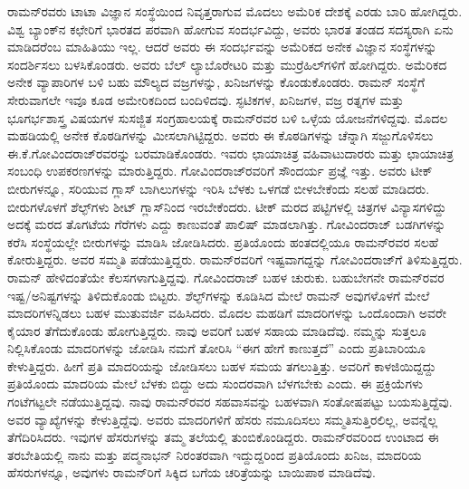 ರಾಮನ್‍ರವರು ಟಾಟಾ ವಿಜ್ಞಾನ ಸಂಸ್ಥೆಯಿಂದ ನಿವೃತ್ತರಾಗುವ ಮೊದಲು ಅಮೆರಿಕ ದೇಶಕ್ಕೆ ಎರಡು ಬಾರಿ ಹೋಗಿದ್ದರು. ವಿಶ್ವ ಬ್ಯಾಂಕ್‍ನ ಕಛೇರಿಗೆ ಭಾರತದ ಪರವಾಗಿ ಹೋಗುವ ಸಂದರ್ಭವಿದ್ದು, ಅವರು ಭಾರತ ತಂಡದ ಸದಸ್ಯರಾಗಿ ಏನು ಮಾಡಿದರೆಂಬ ಮಾಹಿತಿಯು ಇಲ್ಲ. ಆದರೆ ಅವರು ಈ ಸಂದರ್ಭವನ್ನು ಅಮೆರಿಕದ ಅನೇಕ ವಿಜ್ಞಾನ ಸಂಸ್ಥೆಗಳನ್ನು ಸಂದರ್ಶಿಸಲು ಬಳಸಿಕೊಂಡರು. ಅವರು ಬೆಲ್ ಲ್ಯಾಬೊರೇಟರಿ ಮತ್ತು ಮುರ್ರೆಹಿಲ್‍ಗಳಿಗೆ ಹೋಗಿದ್ದರು. ಅಮೆರಿಕದ ಅನೇಕ ವ್ಯಾಪಾರಿಗಳ ಬಳಿ ಬಹು ಮೌಲ್ಯದ ವಜ್ರಗಳನ್ನು, ಖನಿಜಗಳನ್ನು ಕೊಂಡು\-ಕೊಂಡರು. ರಾಮನ್ ಸಂಸ್ಥೆಗೆ ಸೇರುವಾಗಲೇ ಇವೂ ಕೂಡ ಅಮೇರಿಕದಿಂದ ಬಂದಿಳಿದವು. ಸ್ಫಟಿಕಗಳ, ಖನಿಜಗಳ, ವಜ್ರ ರತ್ನಗಳ ಮತ್ತು ಭೂಗರ್ಭಶಾಸ್ತ್ರ ವಿಷಯಗಳ ಸುಸಜ್ಜಿತ ಸಂಗ್ರಹಾಲಯಕ್ಕೆ ರಾಮನ್‍ರವರ ಬಳಿ ಒಳ್ಳೆಯ ಯೋಜನೆಗಳಿದ್ದವು. ಮೊದಲ ಮಹಡಿಯಲ್ಲಿ ಅನೇಕ ಕೊಠಡಿಗಳನ್ನು ಮೀಸಲಾಗಿಟ್ಟಿದ್ದರು. ಅವರು ಈ ಕೊಠಡಿಗಳನ್ನು ಚೆನ್ನಾಗಿ ಸಜ್ಜುಗೊಳಿಸಲು ಈ.ಕೆ.ಗೋವಿಂದರಾಜ್\-‍ರವರನ್ನು ಬರಮಾಡಿಕೊಂಡರು. ಇವರು ಛಾಯಾಚಿತ್ರ ವಹಿವಾಟುದಾರರು ಮತ್ತು ಛಾಯಾಚಿತ್ರ ಸಂಬಂಧಿ ಉಪಕರಣಗಳನ್ನು ಮಾರುತ್ತಿದ್ದರು. ಗೋವಿಂದರಾಜ್‍ರವರಿಗೆ ಸೌಂದರ್ಯ ಪ್ರಜ್ಞೆ ಇತ್ತು. ಅವರು ಟೀಕ್ ಬೀರುಗಳನ್ನೂ, ಸರಿಯುವ ಗ್ಲಾಸ್ ಬಾಗಿಲುಗಳನ್ನು ಇರಿಸಿ ಬೆಳಕು ಒಳಗಡೆ ಬೀಳಬೇಕೆಂದು ಸಲಹೆ ಮಾಡಿದರು. ಬೀರುಗಳೊಳಗೆ ಶೆಲ್ಫ್‌ಗಳು ಶೀಟ್ ಗ್ಲಾಸ್‍ನಿಂದ ಇರಬೇಕೆಂದರು. ಟೀಕ್ ಮರದ ಪಟ್ಟಿಗಳಲ್ಲಿ ಚಿತ್ರಗಳ ವಿನ್ಯಾಸಗಳಿದ್ದು ಅದಕ್ಕೆ ಮರದ ತೊಗಟೆಯ ಗೆರೆಗಳು ಎದ್ದು ಕಾಣುವಂತೆ ಪಾಲಿಷ್ ಮಾಡಲಾಗಿತ್ತು. ಗೋವಿಂದರಾಜ್ ಬಡಗಿಗಳನ್ನು ಕರೆಸಿ ಸಂಸ್ಥೆಯಲ್ಲೇ ಬೀರುಗಳನ್ನು ಮಾಡಿಸಿ ಜೋಡಿಸಿದರು. ಪ್ರತಿಯೊಂದು ಹಂತದಲ್ಲಿಯೂ ರಾಮನ್‍ರವರ ಸಲಹೆ ಕೋರುತ್ತಿದ್ದರು. ಅವರ ಸಮ್ಮತಿ ಪಡೆಯುತ್ತಿದ್ದರು. ರಾಮನ್‍ರವರಿಗೆ ಇಷ್ಟವಾಗದ್ದನ್ನು ಗೋವಿಂದರಾಜ್‍ಗೆ ತಿಳಿಸುತ್ತಿದ್ದರು. ರಾಮನ್ ಹೇಳಿದಂತೆಯೇ ಕೆಲಸಗಳಾಗುತ್ತಿದ್ದವು. ಗೋವಿಂದರಾಜ್ ಬಹಳ ಚುರುಕು. ಬಹುಬೇಗನೇ ರಾಮನ್‍ರವರ ಇಷ್ಟ/ಅನಿಷ್ಟಗಳನ್ನು ತಿಳಿದುಕೊಂಡು ಬಿಟ್ಟರು. ಶೆಲ್ಫ್‌ಗಳನ್ನು ಕೂಡಿಸಿದ ಮೇಲೆ ರಾಮನ್ ಅವುಗಳೊಳಗೆ ಮೇಲೆ ಮಾದರಿಗಳನ್ನಿಡಲು ಬಹಳ ಮುತುವರ್ಜಿ ವಹಿಸಿದರು. ಮೊದಲ ಮಹಡಿಗೆ ಮಾದರಿಗಳನ್ನು ಒಂದೊಂದಾಗಿ ಅವರೇ ಕೈಯಾರ ತೆಗೆದುಕೊಂಡು ಹೋಗುತ್ತಿದ್ದರು. ನಾವು ಅವರಿಗೆ ಬಹಳ ಸಹಾಯ ಮಾಡಿದೆವು. ನಮ್ಮನ್ನು ಸುತ್ತಲೂ ನಿಲ್ಲಿಸಿಕೊಂಡು ಮಾದರಿಗಳನ್ನು ಜೋಡಿಸಿ ನಮಗೆ ತೋರಿಸಿ “ಈಗ ಹೇಗೆ ಕಾಣುತ್ತದೆ” ಎಂದು ಪ್ರತಿಬಾರಿಯೂ ಕೇಳುತ್ತಿದ್ದರು. ಹೀಗೆ ಪ್ರತಿ ಮಾದರಿಯನ್ನು ಜೋಡಿಸಲು ಬಹಳ ಸಮಯ ತಗಲುತ್ತಿತ್ತು. ಅವರಿಗೆ ಕಾಳಜಿಯಿದ್ದದ್ದು ಪ್ರತಿಯೊಂದು ಮಾದರಿಯ ಮೇಲೆ ಬೆಳಕು ಬಿದ್ದು ಅದು ಸುಂದರವಾಗಿ ಬೆಳಗಬೇಕು ಎಂದು. ಈ ಪ್ರಕ್ರಿಯೆಗಳು ಗಂಟೆಗಟ್ಟಲೇ ನಡೆಯುತ್ತಿದ್ದವು. ನಾವು ರಾಮನ್‍ರವರ ಸಹವಾಸವನ್ನು ಬಹಳವಾಗಿ ಸಂತೋಷಪಟ್ಟು ಬಯಸುತ್ತಿದ್ದೆವು. ಅವರ ವ್ಯಾಖ್ಯೆಗಳನ್ನು ಕೇಳುತ್ತಿದ್ದೆವು. ಅವರು ಮಾದರಿಗಳಿಗೆ ಹೆಸರು ನಮೂದಿಸಲು ಸಮ್ಮತಿಸುತ್ತಿರಲಿಲ್ಲ, ಅವನ್ನೆಲ್ಲ ತೆಗೆದಿರಿಸಿದರು. ಇವುಗಳ ಹೆಸರುಗಳನ್ನು ತಮ್ಮ ತಲೆಯಲ್ಲಿ ತುಂಬಿಕೊಂಡಿದ್ದರು. ರಾಮನ್‍ರವರಿಂದ ಉಂಟಾದ ಈ ತರಬೇತಿಯಲ್ಲಿ ನಾನು ಮತ್ತು ಪದ್ಮನಾಭನ್ ನಿರಂತರವಾಗಿ ಇದ್ದುದ್ದರಿಂದ ಪ್ರತಿಯೊಂದು ಖನಿಜ, ಮಾದರಿಯ ಹೆಸರುಗಳನ್ನೂ, ಅವುಗಳು ರಾಮನ್‍ರಿಗೆ ಸಿಕ್ಕಿದ ಬಗೆಯ ಚರಿತ್ರೆಯನ್ನು ಬಾಯಿಪಾಠ ಮಾಡಿದೆವು.

